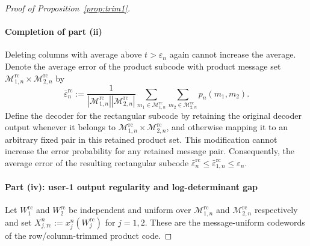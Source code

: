 \documentclass[11pt,onecolumn]{IEEEtran}
\newcommand{\calM}{\mathcal{M}}
\newcommand{\eps}{\varepsilon}
\newcommand{\rc}{\mathrm{rc}}
\begin{document}
\begin{proof}[Proof of Proposition~\ref{prop:trim1}]
\paragraph{Completion of part (ii)} Deleting columns with average above $t>\eps_n$ again cannot increase the average. Denote the
average error of the product subcode with product message set $\calM_{1,n}^\rc\times\calM_{2,n}^\rc$ by 
\begin{equation}
\bar{\eps}_n^\rc :=
\frac{1}
{|\calM_{1,n}^\rc||\calM_{2,n}^\rc|}
\sum_{m_1\in\calM_{1,n}^\rc}
\sum_{m_2\in\calM_{2,n}^\rc}
p_n(m_1,m_2). \label{eqn:mean_errors}
\end{equation}
Define the decoder for the rectangular subcode by retaining the original
decoder output whenever it belongs to
\(\calM_{1,n}^{\rc}\times\calM_{2,n}^{\rc}\), and otherwise mapping it to
an arbitrary fixed pair in this retained product set. This modification
cannot increase the error probability for any retained message pair.
Consequently, the average error of the resulting rectangular subcode 
$\bar{\eps}_n^\rc\le \bar{\eps}_{1,n}^\rc\le\eps_n$.


\paragraph{Part (iv): user-1 output regularity and log-determinant gap} Let $W_1^\rc$ and $W_2^\rc$ be independent and uniform over $\calM_{1,n}^\rc$ and $\calM_{2,n}^\rc$ respectively and set $X_{j,\rc}^n:= x_j^n(W_j^{\rc})$ for $j = 1,2$. These are the message-uniform codewords of the row/column-trimmed product code. 


\end{proof}
\end{document}
